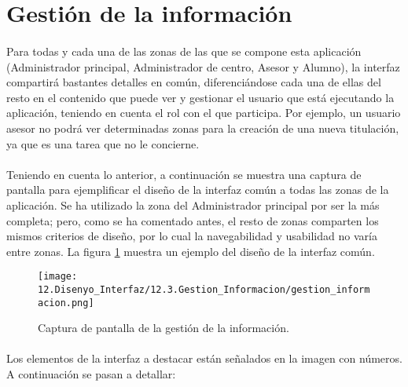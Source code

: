 \section{Gestión de la información}

  \paragraph{}Para todas y cada una de las zonas de las que se compone esta
  aplicación (Administrador principal, Administrador de centro, Asesor y
  Alumno), la interfaz compartirá bastantes detalles en común, diferenciándose
  cada una de ellas del resto en el contenido que puede ver y gestionar el
  usuario que está ejecutando la aplicación, teniendo en cuenta el rol con el
  que participa. Por ejemplo, un usuario asesor no podrá ver determinadas zonas
  para la creación de una nueva titulación, ya que es una tarea que no le
  concierne.

  \paragraph{}Teniendo en cuenta lo anterior, a continuación se muestra una
  captura de pantalla para ejemplificar el diseño de la interfaz común a todas
  las zonas de la aplicación. Se ha utilizado la zona del Administrador
  principal por ser la más completa; pero, como se ha comentado antes, el resto
  de zonas comparten los mismos criterios de diseño, por lo cual la
  navegabilidad y usabilidad no varía entre zonas. La figura
  \ref{capturaGestionInformacion} muestra un ejemplo del diseño de la interfaz
  común.

  \begin{figure}[!ht]
    \begin{center}
      \texttt{[image: 12.Disenyo\_Interfaz/12.3.Gestion\_Informacion/gestion\_informacion.png]}
      \caption{Captura de pantalla de la gestión de la información.}
      \label{capturaGestionInformacion}
    \end{center}
  \end{figure}


  \paragraph{}Los elementos de la interfaz a destacar están señalados en la
  imagen con números. A continuación se pasan a detallar:

